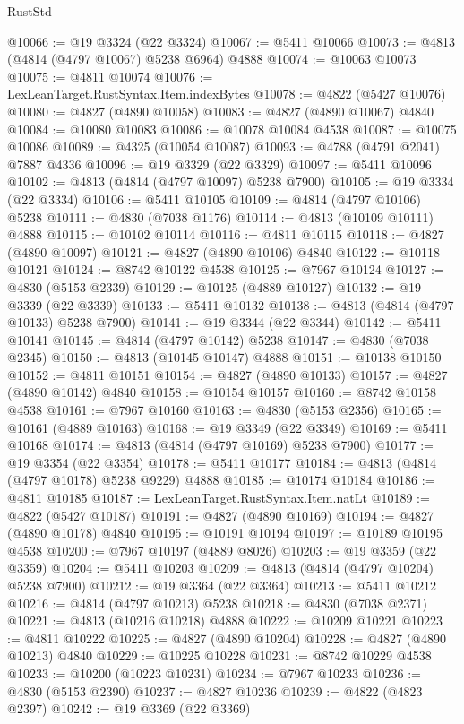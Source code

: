 \begin{lexlean}{RustStd}
\begin{coremodule}
@10066 := @19 @3324 (@22 @3324)
@10067 := @5411 @10066
@10073 := @4813 (@4814 (@4797 @10067) @5238 @6964) @4888
@10074 := @10063 @10073
@10075 := @4811 @10074
@10076 := LexLeanTarget.RustSyntax.Item.indexBytes
@10078 := @4822 (@5427 @10076)
@10080 := @4827 (@4890 @10058)
@10083 := @4827 (@4890 @10067) @4840
@10084 := @10080 @10083
@10086 := @10078 @10084 @4538
@10087 := @10075 @10086
@10089 := @4325 (@10054 @10087)
@10093 := @4788 (@4791 @2041) @7887 @4336
@10096 := @19 @3329 (@22 @3329)
@10097 := @5411 @10096
@10102 := @4813 (@4814 (@4797 @10097) @5238 @7900)
@10105 := @19 @3334 (@22 @3334)
@10106 := @5411 @10105
@10109 := @4814 (@4797 @10106) @5238
@10111 := @4830 (@7038 @1176)
@10114 := @4813 (@10109 @10111) @4888
@10115 := @10102 @10114
@10116 := @4811 @10115
@10118 := @4827 (@4890 @10097)
@10121 := @4827 (@4890 @10106) @4840
@10122 := @10118 @10121
@10124 := @8742 @10122 @4538
@10125 := @7967 @10124
@10127 := @4830 (@5153 @2339)
@10129 := @10125 (@4889 @10127)
@10132 := @19 @3339 (@22 @3339)
@10133 := @5411 @10132
@10138 := @4813 (@4814 (@4797 @10133) @5238 @7900)
@10141 := @19 @3344 (@22 @3344)
@10142 := @5411 @10141
@10145 := @4814 (@4797 @10142) @5238
@10147 := @4830 (@7038 @2345)
@10150 := @4813 (@10145 @10147) @4888
@10151 := @10138 @10150
@10152 := @4811 @10151
@10154 := @4827 (@4890 @10133)
@10157 := @4827 (@4890 @10142) @4840
@10158 := @10154 @10157
@10160 := @8742 @10158 @4538
@10161 := @7967 @10160
@10163 := @4830 (@5153 @2356)
@10165 := @10161 (@4889 @10163)
@10168 := @19 @3349 (@22 @3349)
@10169 := @5411 @10168
@10174 := @4813 (@4814 (@4797 @10169) @5238 @7900)
@10177 := @19 @3354 (@22 @3354)
@10178 := @5411 @10177
@10184 := @4813 (@4814 (@4797 @10178) @5238 @9229) @4888
@10185 := @10174 @10184
@10186 := @4811 @10185
@10187 := LexLeanTarget.RustSyntax.Item.natLt
@10189 := @4822 (@5427 @10187)
@10191 := @4827 (@4890 @10169)
@10194 := @4827 (@4890 @10178) @4840
@10195 := @10191 @10194
@10197 := @10189 @10195 @4538
@10200 := @7967 @10197 (@4889 @8026)
@10203 := @19 @3359 (@22 @3359)
@10204 := @5411 @10203
@10209 := @4813 (@4814 (@4797 @10204) @5238 @7900)
@10212 := @19 @3364 (@22 @3364)
@10213 := @5411 @10212
@10216 := @4814 (@4797 @10213) @5238
@10218 := @4830 (@7038 @2371)
@10221 := @4813 (@10216 @10218) @4888
@10222 := @10209 @10221
@10223 := @4811 @10222
@10225 := @4827 (@4890 @10204)
@10228 := @4827 (@4890 @10213) @4840
@10229 := @10225 @10228
@10231 := @8742 @10229 @4538
@10233 := @10200 (@10223 @10231)
@10234 := @7967 @10233
@10236 := @4830 (@5153 @2390)
@10237 := @4827 @10236
@10239 := @4822 (@4823 @2397)
@10242 := @19 @3369 (@22 @3369)

\end{coremodule}
\end{lexlean}
